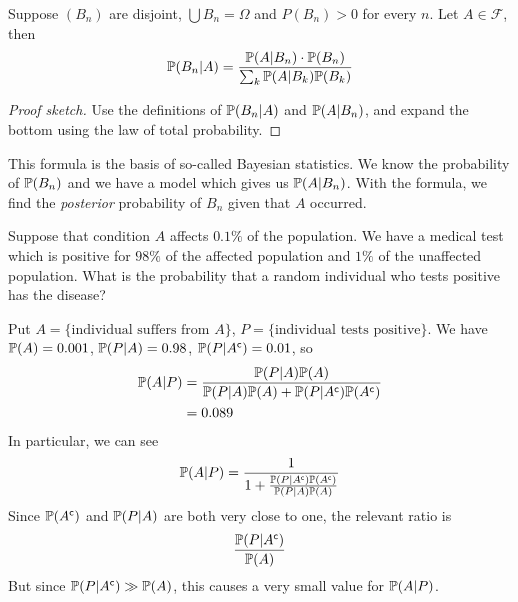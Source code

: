 \documentclass{../template/note}
\begin{document}
    \begin{proposition}
        Suppose \((B_n)\) are disjoint, \(\bigcup B_n = \Omega\) and \(P(B_n) > 0\) for every \(n\). Let \(A \in \mathcal F\), then
        \begin{align*}
            \mathbb P(B_n |  A) = \frac{\mathbb P(A |  B_n) \cdot \mathbb P(B_n)}{\sum_k \mathbb P(A |  B_k)\mathbb P(B_k)}
        \end{align*}
    \end{proposition}
    
    \begin{proof}[Proof sketch]
        Use the definitions of \(\mathbb P(B_n |  A) \) and \(\mathbb P(A |  B_n)\), and expand the bottom using the law of total probability.
    \end{proof}
    
    This formula is the basis of so-called Bayesian statistics. We know the probability of \(\mathbb P(B_n)\) and we have a model which gives us \(\mathbb P(A |  B_n)\). With the formula, we find the \emph{posterior} probability of \(B_n\) given that \(A\) occurred.
    
    \begin{example*}
        Suppose that condition \(A\) affects \(0.1\%\) of the population. We have a medical test which is positive for \(98\%\) of the affected population and \(1\%\) of the unaffected population. What is the probability that a random individual who tests positive has the disease?

        Put \(A = \{\text{individual suffers from }A\}\), \(P = \{\text{individual tests positive}\}\). We have \(\mathbb P(A) = 0.001\), \(\mathbb P(P |  A) = 0.98\), \(\mathbb P(P |  A^{\mathsf{c}}) = 0.01\), so
        \begin{align*}
            \mathbb P(A |  P) &= \frac{\mathbb P(P |  A) \mathbb P(A)}{\mathbb P(P |  A)\mathbb P(A) + \mathbb P(P| A^{\mathsf{c}})\mathbb P(A^{\mathsf{c}})} \\
            &= 0.089
        \end{align*}
        In particular, we can see
        \begin{align*}
            \mathbb P(A |  P) = \frac{1}{1 + \frac{\mathbb P(P| A^{\mathsf{c}})\mathbb P(A^{\mathsf{c}})}{\mathbb P(P |  A)\mathbb P(A)}}
        \end{align*}
        Since \(\mathbb P(A^{\mathsf{c}})\) and \(\mathbb P(P| A)\) are both very close to one, the relevant ratio is
        \begin{align*}
            \frac{\mathbb P(P |  A^{\mathsf{c}})}{\mathbb P(A)}
        \end{align*}
        But since \(\mathbb P(P |  A^{\mathsf{c}}) \gg \mathbb P(A)\), this causes a very small value for \(\mathbb P(A |  P)\).
    \end{example*}
\end{document}
